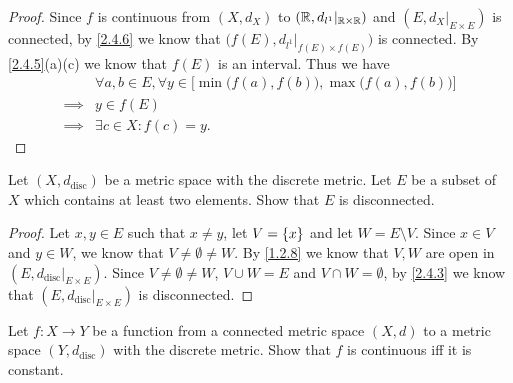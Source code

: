 \begin{proof}
  Since \(f\) is continuous from \((X, d_X)\) to \((\mathbb{R}, d_{l^1}|_{\mathbb{R} \times \mathbb{R}})\) and \((E, d_X|_{E \times E})\) is connected, by \cref{2.4.6} we know that \(\big(f(E), d_{l^1}|_{f(E) \times f(E)}\big)\) is connected.
  By \cref{2.4.5}(a)(c) we know that \(f(E)\) is an interval.
  Thus we have
  \begin{align*}
             & \forall a, b \in E, \forall y \in \Big[\min\big(f(a), f(b)\big), \max\big(f(a), f(b)\big)\Big] \\
    \implies & y \in f(E)                                                                                     \\
    \implies & \exists c \in X : f(c) = y.
  \end{align*}
\end{proof}

\exercisesection

\begin{ex}\label{ex:2.4.1}
  Let \((X, d_{\text{disc}})\) be a metric space with the discrete metric.
  Let \(E\) be a subset of \(X\) which contains at least two elements.
  Show that \(E\) is disconnected.
\end{ex}

\begin{proof}
  Let \(x, y \in E\) such that \(x \neq y\), let \(V = \left\lbrace x\right\rbrace\) and let \(W = E \setminus V\).
  Since \(x \in V\) and \(y \in W\), we know that \(V \neq \emptyset \neq W\).
  By \cref{1.2.8} we know that \(V, W\) are open in \((E, d_{\text{disc}}|_{E \times E})\).
  Since \(V \neq \emptyset \neq W\), \(V \cup W = E\) and \(V \cap W = \emptyset\), by \cref{2.4.3} we know that \((E, d_{\text{disc}}|_{E \times E})\) is disconnected.
\end{proof}

\begin{ex}\label{ex:2.4.2}
  Let \(f : X \to Y\) be a function from a connected metric space \((X, d)\) to a metric space \((Y, d_{\text{disc}})\) with the discrete metric.
  Show that \(f\) is continuous iff it is constant.
\end{ex}

